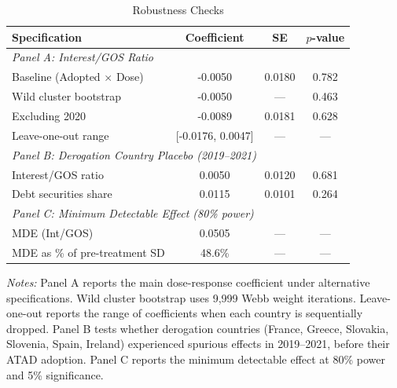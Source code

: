 \begin{table}[t]
\centering
\caption{Robustness Checks}
\label{tab:robustness}
\small
\begin{tabular}{lccc}
\toprule
Specification & Coefficient & SE & $p$-value \\
\midrule
\multicolumn{4}{l}{\textit{Panel A: Interest/GOS Ratio}} \\[3pt]
Baseline (Adopted $\times$ Dose) & -0.0050 & 0.0180 & 0.782 \\
Wild cluster bootstrap & -0.0050 & --- & 0.463 \\
Excluding 2020 & -0.0089 & 0.0181 & 0.628 \\
Leave-one-out range & [-0.0176, 0.0047] & --- & --- \\
\midrule
\multicolumn{4}{l}{\textit{Panel B: Derogation Country Placebo (2019--2021)}} \\[3pt]
Interest/GOS ratio & 0.0050 & 0.0120 & 0.681 \\
Debt securities share & 0.0115 & 0.0101 & 0.264 \\
\midrule
\multicolumn{4}{l}{\textit{Panel C: Minimum Detectable Effect (80\% power)}} \\[3pt]
MDE (Int/GOS) & 0.0505 & --- & --- \\
MDE as \% of pre-treatment SD & 48.6\% & --- & --- \\
\bottomrule
\end{tabular}
\begin{tablenotes}
\item \textit{Notes:} Panel A reports the main dose-response coefficient under alternative specifications. Wild cluster bootstrap uses 9,999 Webb weight iterations. Leave-one-out reports the range of coefficients when each country is sequentially dropped. Panel B tests whether derogation countries (France, Greece, Slovakia, Slovenia, Spain, Ireland) experienced spurious effects in 2019--2021, before their ATAD adoption. Panel C reports the minimum detectable effect at 80\% power and 5\% significance.
\end{tablenotes}
\end{table}
